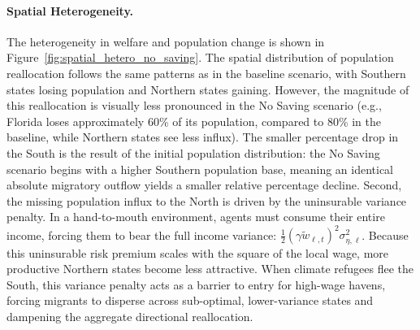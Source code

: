 \documentclass[12pt, a4paper]{article}
\begin{document}
\paragraph{Spatial Heterogeneity.} The heterogeneity in welfare and population change is shown in Figure~\ref{fig:spatial_hetero_no_saving}. The spatial distribution of population reallocation follows the same patterns as in the baseline scenario, with Southern states losing population and Northern states gaining. However, the magnitude of this reallocation is visually less pronounced in the No Saving scenario (e.g., Florida loses approximately 60\% of its population, compared to 80\% in the baseline, while Northern states see less influx). The smaller percentage drop in the South is the result of the initial population distribution: the No Saving scenario begins with a higher Southern population base, meaning an identical absolute migratory outflow yields a smaller relative percentage decline. Second, the missing population influx to the North is driven by the uninsurable variance penalty. In a hand-to-mouth environment, agents must consume their entire income, forcing them to bear the full income variance: $\frac{1}{2}(\gamma \tilde{w}_{\ell,t})^2 \sigma_{\eta,\ell}^2$. Because this uninsurable risk premium scales with the square of the local wage, more productive Northern states become less attractive. When climate refugees flee the South, this variance penalty acts as a barrier to entry for high-wage havens, forcing migrants to disperse across sub-optimal, lower-variance states and dampening the aggregate directional reallocation.


\end{document}
